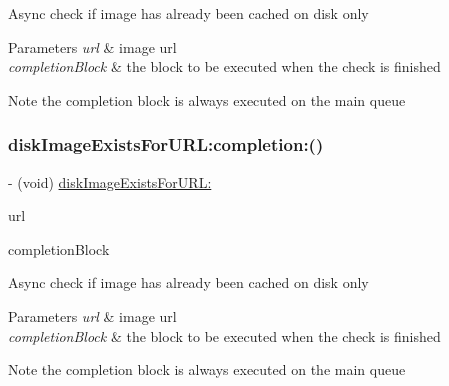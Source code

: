 Async check if image has already been cached on disk only


\begin{DoxyParams}{Parameters}
{\em url} & image url \\
\hline
{\em completion\+Block} & the block to be executed when the check is finished\\
\hline
\end{DoxyParams}
\begin{DoxyNote}{Note}
the completion block is always executed on the main queue 
\end{DoxyNote}
\mbox{\label{interface_s_d_web_image_manager_a05c93459fc0727ca8e7139cfc9d9750c}} 
\subsubsection{\texorpdfstring{disk\+Image\+Exists\+For\+U\+R\+L\+:completion\+:()}{diskImageExistsForURL:completion:()}\hspace{0.1cm}{\footnotesize\ttfamily [3/3]}}
{\footnotesize\ttfamily -\/ (void) \mbox{\hyperlink{interface_s_d_web_image_manager_a7ed53c304da787466f777c636447e6d0}{disk\+Image\+Exists\+For\+U\+R\+L\+:}} \begin{DoxyParamCaption}\item[{(N\+S\+U\+RL $\ast$)}]{url }\item[{completion:(S\+D\+Web\+Image\+Check\+Cache\+Completion\+Block)}]{completion\+Block }\end{DoxyParamCaption}}

Async check if image has already been cached on disk only


\begin{DoxyParams}{Parameters}
{\em url} & image url \\
\hline
{\em completion\+Block} & the block to be executed when the check is finished\\
\hline
\end{DoxyParams}
\begin{DoxyNote}{Note}
the completion block is always executed on the main queue 
\end{DoxyNote}
\mbox{\label{interface_s_d_web_image_manager_ab094c361edd5ff886cbf484892e688be}} 
